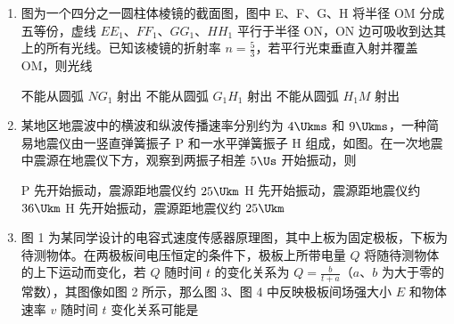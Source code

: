 \documentclass[\gkver]{gaokaozhenti}
\begin{document}
\begin{enumerate}
\item
图为一个四分之一圆柱体棱镜的截面图，图中 E、F、G、H 将半径 OM 分成五等份，虚线 $EE_{1}$、$FF_{1}$、$GG_{1}$、$HH_{1}$ 平行于半径 ON，ON 边可吸收到达其上的所有光线。已知该棱镜的折射率 $n=\frac{5}{3}$，若平行光束垂直入射并覆盖 OM，则光线


{不能从圆弧 $NG_{1}$ 射出}
{不能从圆弧 $G_{1}H_{1}$ 射出}
{不能从圆弧 $H_{1}M$ 射出}


\item
某地区地震波中的横波和纵波传播速率分别约为 $4\Ukms$ 和 $9\Ukms$，一种简易地震仪由一竖直弹簧振子 P 和一水平弹簧振子 H 组成，如图。在一次地震中震源在地震仪下方，观察到两振子相差 $5\Us$ 开始振动，则


{P 先开始振动，震源距地震仪约 $25\Ukm$}
{H 先开始振动，震源距地震仪约 $36\Ukm$}
{H 先开始振动，震源距地震仪约 $25\Ukm$}


\item
图 1 为某同学设计的电容式速度传感器原理图，其中上板为固定极板，下板为待测物体。在两极板间电压恒定的条件下，极板上所带电量 $Q$ 将随待测物体的上下运动而变化，若 $Q$ 随时间 $t$ 的变化关系为 $Q=\frac{b}{t+a}$（$a$、$b$ 为大于零的常数），其图像如图 2 所示，那么图 3、图 4 中反映极板间场强大小 $E$ 和物体速率 $v$ 随时间 $t$ 变化关系可能是


\end{enumerate}
\end{document}
